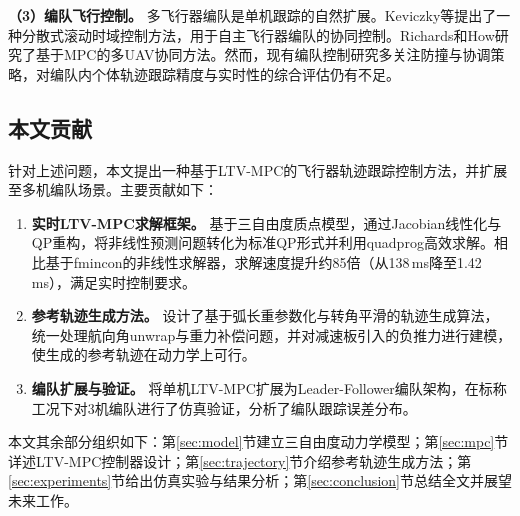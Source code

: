 \textbf{（3）编队飞行控制。} 多飞行器编队是单机跟踪的自然扩展。Keviczky等\cite{Keviczky2008}提出了一种分散式滚动时域控制方法，用于自主飞行器编队的协同控制。Richards和How\cite{Richards2004}研究了基于MPC的多UAV协同方法。然而，现有编队控制研究多关注防撞与协调策略，对编队内个体轨迹跟踪精度与实时性的综合评估仍有不足。

\subsection{本文贡献}

针对上述问题，本文提出一种基于LTV-MPC的飞行器轨迹跟踪控制方法，并扩展至多机编队场景。主要贡献如下：

\begin{enumerate}[label=（\arabic*）,leftmargin=*]
    \item \textbf{实时LTV-MPC求解框架。} 基于三自由度质点模型，通过Jacobian线性化与QP重构，将非线性预测问题转化为标准QP形式并利用quadprog高效求解。相比基于fmincon的非线性求解器，求解速度提升约85倍（从138\,ms降至1.42\,ms），满足实时控制要求。
    
    \item \textbf{参考轨迹生成方法。} 设计了基于弧长重参数化与转角平滑的轨迹生成算法，统一处理航向角unwrap与重力补偿问题，并对减速板引入的负推力进行建模，使生成的参考轨迹在动力学上可行。
    
    \item \textbf{编队扩展与验证。} 将单机LTV-MPC扩展为Leader-Follower编队架构，在标称工况下对3机编队进行了仿真验证，分析了编队跟踪误差分布。
\end{enumerate}

本文其余部分组织如下：第\ref{sec:model}节建立三自由度动力学模型；第\ref{sec:mpc}节详述LTV-MPC控制器设计；第\ref{sec:trajectory}节介绍参考轨迹生成方法；第\ref{sec:experiments}节给出仿真实验与结果分析；第\ref{sec:conclusion}节总结全文并展望未来工作。
